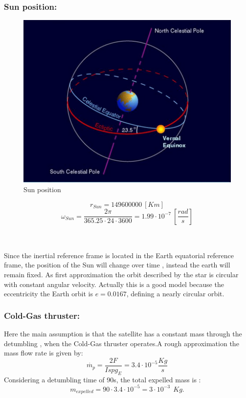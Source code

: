 \documentclass[11pt]{article}
\begin{document}
\subsubsection{Sun position:}
\begin{minipage}{.5\textwidth}
\begin{figure} [H]
\centering 
\includegraphics[scale=0.79]{ecliptic.PNG}
\caption{ Sun position
\cite{ecliptic}}
\end{figure}
\end{minipage}
\begin{minipage}{.5\textwidth}
\begin{equation}
r_{Sun}= 149600000 \ [Km]
\end{equation}
\begin{equation}
\omega_{Sun}=\frac{2 \pi}{365.25 \cdot 24 \cdot 3600 }=1.99 \cdot 10^{-7} \ \left[ \frac{rad}{s} \right] 
\end{equation}
\end{minipage}\\\\
Since the inertial reference frame is located in the Earth equatorial reference frame, the position of the Sun will change over time , instead the earth will remain fixed. As first approximation the orbit described by the star is circular with constant angular velocity. Actually this is a good model because the eccentricity the Earth orbit is $ e=0.0167$, defining  a nearly circular orbit.
\subsubsection{Cold-Gas thruster:}
Here the main assumption is that the satellite  has a constant mass through the detumbling , when the Cold-Gas thruster operates.A rough approximation   the mass flow rate is given by:
\begin{equation}
    \dot{m_p}=\frac{2F}{Ispg_E}=3.4\cdot10^{-5} \frac{Kg}{s}
\end{equation}
 Considering a detumbling time of 90s, the total expelled mass is :
 \begin{equation}
     m_{expelled}=90\cdot3.4\cdot10^{-5}=3\cdot10^{-3} \ \ Kg.
 \end{equation}
\end{document}

